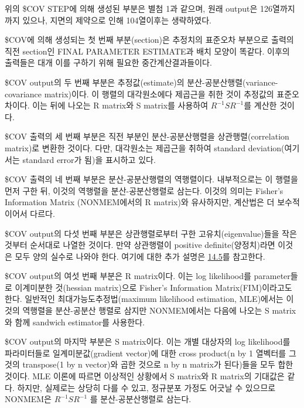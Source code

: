 \documentclass[
  10pt,
  krantz2,
  a4paper]{krantz}
\theoremstyle{definition}
\theoremstyle{definition}
\theoremstyle{definition}
\theoremstyle{remark}
\begin{document}
위의 \$COV STEP에 의해 생성된 부분은 별첨 1과 같으며, 원래 output은 126열까지까지 있으나, 지면의 제약으로 인해 104열이후는 생략하였다.

\$COV에 의해 생성되는 첫 번째 부분(section)은 추정치의 표준오차 부분으로 출력의 직전 section인 FINAL PARAMETER ESTIMATE과 배치 모양이 똑같다. 이후의 출력들은 대개 이를 구하기 위해 필요한 중간계산결과들이다.

\$COV output의 두 번째 부분은 추정값(estimate)의 분산-공분산행렬(variance-covariance matrix)이다. 이 행렬의 대각원소에다 제곱근을 취한 것이 추정값의 표준오차이다. 이는 뒤에 나오는 R matrix와 S matrix를 사용하여 \(R^{- 1}SR^{- 1}\)를 계산한 것이다.

\$COV 출력의 세 번째 부분은 직전 부분인 분산-공분산행렬을 상관행렬(correlation matrix)로 변환한 것이다. 다만, 대각원소는 제곱근을 취하여 standard deviation(여기서는 standard error가 됨)을 표시하고 있다.

\$COV 출력의 네 번째 부분은 분산-공분산행렬의 역행렬이다. 내부적으로는 이 행렬을 먼저 구한 뒤, 이것의 역행렬을 분산-공분산행렬로 삼는다. 이것의 의미는 Fisher's Information Matrix (NONMEM에서의 R matrix)와 유사하지만, 계산법은 더 보수적이어서 다르다.

\$COV output의 다섯 번째 부분은 상관행렬로부터 구한 고유치(eigenvalue)들을 작은 것부터 순서대로 나열한 것이다. 만약 상관행렬이 positive definite(양정치)라면 이것은 모두 양의 실수로 나와야 한다. 여기에 대한 추가 설명은 \protect\hyperlink{Theoph}{14.5}를 참고한다.

\$COV output의 여섯 번째 부분은 R matrix이다. 이는 log likelihood를 parameter들로 이계미분한 것(hessian matrix)으로 Fisher's Information Matrix(FIM)이라고도 한다. 일반적인 최대가능도추정법(maximum likelihood estimation, MLE)에서는 이것의 역행렬을 분산-공분산 행렬로 삼지만 NONMEM에서는 다음에 나오는 S matrix와 함께 sandwich estimator를 사용한다.

\$COV output의 마지막 부분은 S matrix이다. 이는 개별 대상자의 log likelihood를 파라미터들로 일계미분값(gradient vector)에 대한 cross product(n by 1 열벡터를 그것의 transpose(1 by n vector)와 곱한 것으로 n by n matrix가 된다)들을 모두 합한 것이다. MLE 이론에 따르면 이상적인 상황에서 S matrix와 R matrix의 기대값은 같다. 하지만, 실제로는 상당히 다를 수 있고, 정규분포 가정도 어긋날 수 있으므로 NONMEM은 \(R^{- 1}SR^{- 1}\) 를 분산-공분산행렬로 삼는다.
\end{document}
